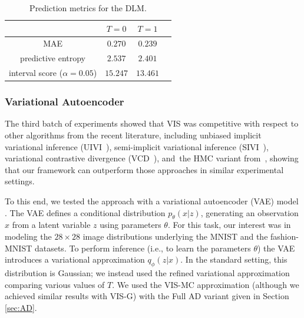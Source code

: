 \begin{table}[!h]
\centering
\caption{Prediction metrics for the DLM.}\label{tbl:preds_dlm}
\begin{tabular}{c@{\hskip 1.1in}c@{\hskip 1in}c@{\hskip 1in}c}
\toprule
   & ${T=0}$                             & ${T=1}$   \\ 
 \midrule
    MAE          & $0.270$ &  $0.239$ \\

    predictive entropy          & $2.537$ &  $2.401$ \\
    interval score ($\alpha=0.05$) & $15.247$ & $13.461$\\
 \bottomrule
\end{tabular}
\end{table}

\subsubsection*{Variational Autoencoder}

The third batch of experiments showed that VIS 
was competitive with respect to other algorithms from the recent literature, including unbiased implicit variational inference (UIVI~\parencite{pmlr-v89-titsias19a}), semi-implicit variational inference (SIVI~\parencite{yin2018semi}),  variational contrastive divergence (VCD~\parencite{pmlr-v97-ruiz19a}), 
and~the HMC variant from~\parencite{hoffman2017learning}, showing that our framework can outperform those approaches in similar experimental settings. 

 To this end, we tested the approach with a variational autoencoder (VAE) model \parencite{kingma2013auto}. %
The VAE defines a conditional distribution $p_{\theta}(x | z)$, generating an observation $x$ from a latent variable $z$ using {parameters $\theta$}. For this task, our interest 
was in modeling the $28 \times 28$ image distributions 
underlying the MNIST %
\parencite{lecun-mnisthandwrittendigit-2010} and the fashion-MNIST \parencite{xiao2017/online} datasets. To perform inference (i.e., to learn
the parameters $\theta$) the VAE introduces a variational approximation $q_{\phi}(z | x)$. In the standard setting, this distribution is Gaussian; we instead used the refined variational approximation comparing various values of $T$. We used the VIS-MC approximation (although we achieved similar results
with VIS-G) with the Full AD variant given in Section \ref{sec:AD}.

